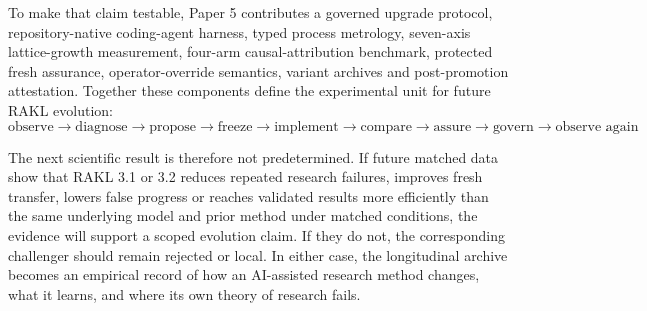 To make that claim testable, Paper 5 contributes a governed upgrade protocol, repository-native coding-agent harness, typed process metrology, seven-axis lattice-growth measurement, four-arm causal-attribution benchmark, protected fresh assurance, operator-override semantics, variant archives and post-promotion attestation. Together these components define the experimental unit for future RAKL evolution:
\[
\boxed{
\text{observe}
\rightarrow\text{diagnose}
\rightarrow\text{propose}
\rightarrow\text{freeze}
\rightarrow\text{implement}
\rightarrow\text{compare}
\rightarrow\text{assure}
\rightarrow\text{govern}
\rightarrow\text{observe again}
}.
\]

The next scientific result is therefore not predetermined. If future matched data show that RAKL 3.1 or 3.2 reduces repeated research failures, improves fresh transfer, lowers false progress or reaches validated results more efficiently than the same underlying model and prior method under matched conditions, the evidence will support a scoped evolution claim. If they do not, the corresponding challenger should remain rejected or local. In either case, the longitudinal archive becomes an empirical record of how an AI-assisted research method changes, what it learns, and where its own theory of research fails.